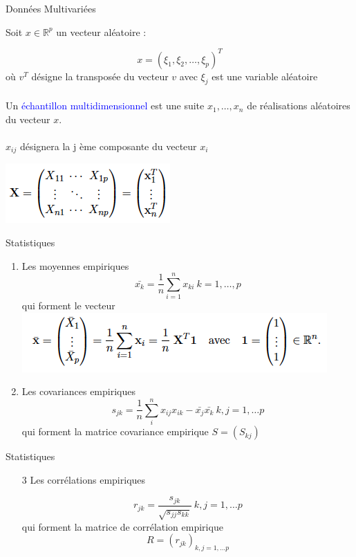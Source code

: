 \documentclass[10pt]{beamer}
\begin{document}
\begin{frame}{Données Multivariées}

 Soit $x \in \mathbb{R}^p$ un vecteur aléatoire :
 
 $$ x=(\xi_1,\xi_2, \ldots, \xi_p )^T$$ où $v^T$ désigne la transposée du vecteur $v$  avec $\xi_j$ est une variable aléatoire\\~\\
 Un \textcolor{blue}{échantillon multidimensionnel} est une suite $x_1, \ldots, x_n$ de  réalisations aléatoires du vecteur $x$.\\~\\
 
 $x_{ij}$ désignera la j ème composante du vecteur $x_i$
 
\centering 
 \includegraphics[scale=0.6]{X.png} 
 

\end{frame}
 

\begin{frame}{Statistiques}

  \begin{enumerate}
  \item Les moyennes empiriques
  $$\bar{x_k}=\frac{1}{n}\sum_{i=1}^nx_{ki} \ k=1, \ldots, p $$ qui forment le vecteur 
  \includegraphics[scale=0.6]{X_bar.png} 
  \item
  Les covariances empiriques
  $$ s_{jk}=\frac{1}{n}\sum_{i}^n x_{ij}x_{ik}-\bar{x_j}\bar{x_k}  \  k,j=1, \ldots p $$ qui forment la matrice covariance empirique $ S=(S_{kj}) $
  \end{enumerate}
\end{frame}

 
 \begin{frame}{Statistiques}

  \begin{enumerate}
  \item[3] Les corrélations empiriques
  
  $$ r_{jk}=\frac{s_{jk}}{\sqrt{s_{jj}s_{kk}}}   \  k,j=1, \ldots p $$  qui forment la matrice de corrélation empirique
  $$ R=(r_{jk})_{k, j=1, \ldots p} $$ 
  \end{enumerate}
\end{frame}
\end{document}
